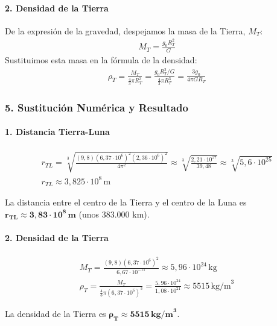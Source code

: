 \paragraph{2. Densidad de la Tierra}
De la expresión de la gravedad, despejamos la masa de la Tierra, $M_T$:
\begin{gather}
    M_T = \frac{g_0 R_T^2}{G}
\end{gather}
Sustituimos esta masa en la fórmula de la densidad:
\begin{gather}
    \rho_T = \frac{M_T}{\frac{4}{3}\pi R_T^3} = \frac{g_0 R_T^2 / G}{\frac{4}{3}\pi R_T^3} = \frac{3 g_0}{4\pi G R_T}
\end{gather}

\subsubsection*{5. Sustitución Numérica y Resultado}
\paragraph{1. Distancia Tierra-Luna}
\begin{gather}
    r_{TL} = \sqrt[3]{\frac{(9,8)(6,37\cdot10^6)^2(2,36\cdot10^6)^2}{4\pi^2}} \approx \sqrt[3]{\frac{2,21 \cdot 10^{27}}{39,48}} \approx \sqrt[3]{5,6 \cdot 10^{25}} \\
    r_{TL} \approx 3,825 \cdot 10^8 \, \text{m}
\end{gather}
\begin{cajaresultado}
La distancia entre el centro de la Tierra y el centro de la Luna es $\boldsymbol{r_{TL} \approx 3,83 \cdot 10^8 \, \textbf{m}}$ (unos 383.000 km).
\end{cajaresultado}

\paragraph{2. Densidad de la Tierra}
\begin{gather}
    M_T = \frac{(9,8)(6,37\cdot10^6)^2}{6,67\cdot10^{-11}} \approx 5,96 \cdot 10^{24} \, \text{kg} \\
    \rho_T = \frac{M_T}{\frac{4}{3}\pi (6,37\cdot10^6)^3} = \frac{5,96 \cdot 10^{24}}{1,08 \cdot 10^{21}} \approx 5515 \, \text{kg/m}^3
\end{gather}
\begin{cajaresultado}
La densidad de la Tierra es $\boldsymbol{\rho_T \approx 5515 \, \textbf{kg/m}^3}$.
\end{cajaresultado}

